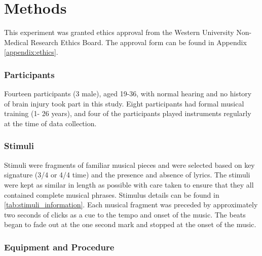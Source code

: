 \chapter*{Methods}
This experiment was granted ethics approval from the Western University Non-Medical Research Ethics Board. 
The approval form can be found in Appendix \ref{appendix:ethics}.
\subsection*{Participants}
Fourteen participants (3 male), aged 19-36, with normal hearing and no history of brain injury took part in this study. Eight participants had formal musical training (1- 26 years), and four of the participants played instruments regularly at the time of data collection.
\vspace{-0.5em}
\subsection*{Stimuli}
Stimuli were fragments of familiar musical pieces and were selected based on key signature (3/4 or 4/4 time) and the presence and absence of lyrics. The stimuli were kept as similar in length as possible with care taken to ensure that they all contained complete musical phrases. Stimulus details can be found in \autoref{tab:stimuli_information}.
Each musical fragment was preceded by approximately two seconds of clicks as a cue to the tempo and onset of the music. The beats began to fade out at the one second mark and stopped at the onset of the music. 

\subsection*{Equipment and Procedure}
